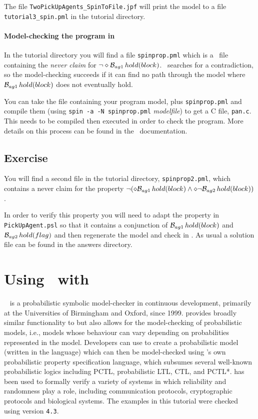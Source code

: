 \documentclass[a4]{article}
\begin{document}
The file \texttt{TwoPickUpAgents\_SpinToFile.jpf} will print the model to a file \texttt{tutorial3\_spin.pml} in the tutorial directory.

\paragraph{Model-checking the program in \spin}  In the tutorial directory you will find a file \texttt{spinprop.pml} which is a \promela\ file containing the \emph{never claim} for $\neg \diamond \mathrm{{\cal B}}_{ag1} \, hold(block)$.  \spin\ searches for a contradiction, so the model-checking succeeds if it can find no path through the model where $\mathrm{{\cal B}}_{ag1} \, hold(block)$ does not eventually hold.  

You can take the file containing  your program model, plus \texttt{spinprop.pml} and compile them (using \texttt{spin -a -N spinprop.pml} \emph{modelfile}) to get a C file, \texttt{pan.c}.  This needs to be compiled then executed in order to check the program.  More details on this process can be found in the \spin\ documentation.

\subsection{Exercise}

You will find a second file in the tutorial directory, \texttt{spinprop2.pml}, which contains a never claim for the property $\neg (\diamond \mathrm{{\cal B}}_{ag1} \, hold(block) \wedge \diamond \neg \mathrm{{\cal B}}_{ag2} \, hold(block))$.

\begin{sloppypar}
In order to verify this property you will need to adapt the property in \texttt{PickUpAgent.psl} so that it contains a  conjunction of $\mathrm{{\cal B}}_{ag1} \, hold(block)$ and $\mathrm{{\cal B}}_{ag2} \, hold(flag)$ and then regenerate the model and check in \spin.  As usual a solution file can be found in the answers directory.
\end{sloppypar}

\section{Using \ajpf\ with \prism}
\prism{}~\cite{KNP11} is a probabilistic symbolic model-checker in
continuous development, primarily at the Universities of Birmingham
and Oxford, since 1999. \prism{} provides broadly similar
functionality to \spin{} but also allows for the model-checking of
probabilistic models, i.e., models whose behaviour can vary depending
on probabilities represented in the model. Developers can use \prism{} to
create a probabilistic model (written in the \prism{} language) which
can then be model-checked using \prism{}'s own probabilistic property
specification language, which subsumes several well-known
probabilistic logics including PCTL, probabilistic LTL, CTL, and
PCTL*.  \prism{} has been used to formally verify a variety of systems
in which reliability and randomness play a role, including
communication protocols, cryptographic protocols and biological
systems. The examples in this tutorial were checked using \prism{} version
\texttt{4.3}.
\end{document}
